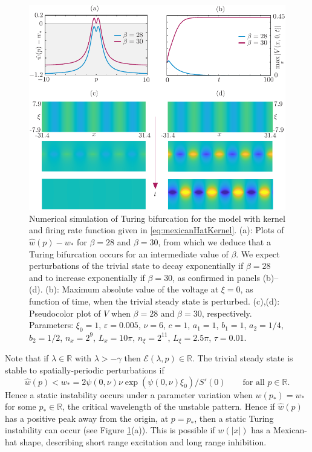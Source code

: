 \documentclass[a4paper,final]{siamart190516}
\newcommand{\Rb}{\mathbb{R}}
\newcommand{\ep}{\varepsilon}
\begin{document}
\begin{figure}
  \centering
  \includegraphics{TuringStatic}
  \caption{Numerical simulation of Turing bifurcation for the model with kernel and
   firing rate function given in \eqref{eq:mexicanHatKernel}. (a): Plots of $\hat w(p) - w_*$
   for $\beta = 28$ and $\beta=30$, from which we deduce
that a Turing bifurcation occurs for an intermediate value of $\beta$. We expect
perturbations of the trivial state to decay exponentially if $\beta=28$ and to increase
exponentially if $\beta = 30$, as confirmed in panels (b)--(d). (b): Maximum absolute
value of the voltage at $\xi=0$, as function of time, when the trivial steady state is
perturbed. (c),(d): Pseudocolor plot of $V$ when $\beta=28$ and $\beta=30$, respectively.
Parameters: $\xi_0 = 1$, $\ep = 0.005$, $\nu  = 6$, $c = 1$, $a_1 = 1$, $b_1 =
1$, $a_2 = 1/4$, $b_2 = 1/2$, $n_x  = 2^9$, $L_x  = 10\pi$, $n_\xi = 2^{11}$, $L_\xi =
2.5 \pi$, $\tau = 0.01$. }
  \label{fig:TuringStatic}
\end{figure}

Note that if $\lambda \in \Rb$ with $\lambda > -\gamma$ then $\mathcal{E}(\lambda,p) \in
\Rb$.
The trivial steady state is stable to spatially-periodic perturbations if 
\[
  \hat w(p) < w_* = 2\psi(0,\nu) \nu \exp(\psi(0,\nu) \xi_0)/S'(0)  \qquad
  \text{for all $p \in \Rb$}.
\]
Hence a static instability occurs under a parameter variation when $w(p_*) = w_*$ for
some $p_* \in \Rb$, the critical wavelength of the unstable pattern.
Hence if $\widehat{w}(p)$ has a positive peak away from the origin, at $p=p_*$, then a static
Turing instability can occur (see Figure \ref{fig:TuringStatic}(a)). This is possible
if $w(|x|)$ has a Mexican-hat shape, describing short range excitation and long range
inhibition. 
\end{document}

